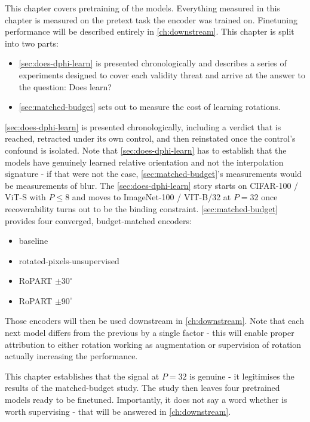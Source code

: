 \documentclass[final_report.tex]{subfiles}
\begin{document}
\label{ch:pretraining}
This chapter covers pretraining of the models. Everything measured in this chapter is measured on the pretext task the encoder was trained on. Finetuning performance will be described entirely in \cref{ch:downstream}. This chapter is split into two parts: 
\begin{itemize}
\item \cref{sec:does-dphi-learn} is presented chronologically and describes a series of experiments designed to cover each validity threat and arrive at the answer to the question: Does \dphi{} learn?
\item \cref{sec:matched-budget} sets out to measure the cost of learning rotations. 
\end{itemize}

\cref{sec:does-dphi-learn} is presented chronologically, including a verdict that is reached, retracted under its own control, and then reinstated once the control's confound is isolated. Note that \cref{sec:does-dphi-learn} has to establish that the models have genuinely learned relative orientation and not the interpolation signature - if that were not the case, \cref{sec:matched-budget}'s measurements would be measurements of blur. The \cref{sec:does-dphi-learn} story starts on CIFAR-100 / ViT-S with $P\leq 8$ and moves to ImageNet-100 / VIT-B/32 at $P=32$ once recoverability turns out to be the binding constraint. \cref{sec:matched-budget} provides four converged, budget-matched encoders: 
\begin{itemize}
\item baseline
\item rotated-pixels-unsupervised
\item RoPART $\pm30^\circ$
\item RoPART $\pm90^\circ$
\end{itemize}
Those encoders will then be used downstream in \cref{ch:downstream}. Note that each next model differs from the previous by a single factor - this will enable proper attribution to either rotation working as augmentation or supervision of rotation actually increasing the performance. 

This chapter establishes that the signal at $P=32$ is genuine - it legitimises the results of the matched-budget study. The study then leaves four pretrained models ready to be finetuned. Importantly, it does not say a word whether \dphi{} is worth supervising - that will be answered in \cref{ch:downstream}.

\end{document}
